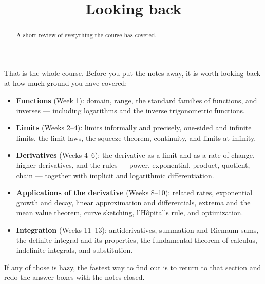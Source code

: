 \documentclass{ximera}
\title{Looking back}
\begin{document}
\begin{abstract}
A short review of everything the course has covered.
\end{abstract}
\maketitle

That is the whole course. Before you put the notes away, it is worth looking back at how much ground you have covered:

\begin{itemize}
  \item \textbf{Functions} (Week 1): domain, range, the standard families of functions, and inverses --- including logarithms and the inverse trigonometric functions.
  \item \textbf{Limits} (Weeks 2--4): limits informally and precisely, one-sided and infinite limits, the limit laws, the squeeze theorem, continuity, and limits at infinity.
  \item \textbf{Derivatives} (Weeks 4--6): the derivative as a limit and as a rate of change, higher derivatives, and the rules --- power, exponential, product, quotient, chain --- together with implicit and logarithmic differentiation.
  \item \textbf{Applications of the derivative} (Weeks 8--10): related rates, exponential growth and decay, linear approximation and differentials, extrema and the mean value theorem, curve sketching, l'H\^opital's rule, and optimization.
  \item \textbf{Integration} (Weeks 11--13): antiderivatives, summation and Riemann sums, the definite integral and its properties, the fundamental theorem of calculus, indefinite integrals, and substitution.
\end{itemize}

If any of those is hazy, the fastest way to find out is to return to that section and redo the answer boxes with the notes closed.
\end{document}
